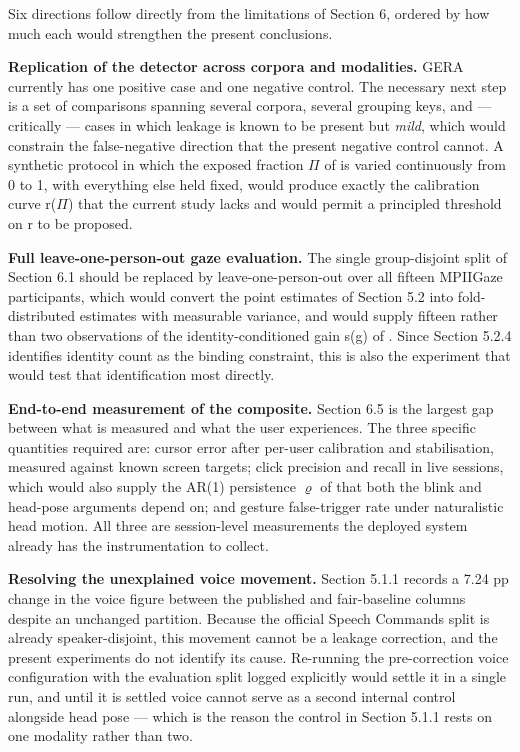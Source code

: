 Six directions follow directly from the limitations of Section 6, ordered by how much each would strengthen the present conclusions.

\textbf{Replication of the detector across corpora and modalities.} GERA currently has one positive case and one negative control. The necessary next step is a set of comparisons spanning several corpora, several grouping keys, and --- critically --- cases in which leakage is known to be present but \emph{mild}, which would constrain the false-negative direction that the present negative control cannot. A synthetic protocol in which the exposed fraction $\Pi$ of  is varied continuously from 0 to 1, with everything else held fixed, would produce exactly the calibration curve r($\Pi$) that the current study lacks and would permit a principled threshold on r to be proposed.

\textbf{Full leave-one-person-out gaze evaluation.} The single group-disjoint split of Section 6.1 should be replaced by leave-one-person-out over all fifteen MPIIGaze participants, which would convert the point estimates of Section 5.2 into fold-distributed estimates with measurable variance, and would supply fifteen rather than two observations of the identity-conditioned gain s(g) of . Since Section 5.2.4 identifies identity count as the binding constraint, this is also the experiment that would test that identification most directly.

\textbf{End-to-end measurement of the composite.} Section 6.5 is the largest gap between what is measured and what the user experiences. The three specific quantities required are: cursor error after per-user calibration and stabilisation, measured against known screen targets; click precision and recall in live sessions, which would also supply the AR(1) persistence $\varrho$ of  that both the blink and head-pose arguments depend on; and gesture false-trigger rate under naturalistic head motion. All three are session-level measurements the deployed system already has the instrumentation to collect.

\textbf{Resolving the unexplained voice movement.} Section 5.1.1 records a 7.24 pp change in the voice figure between the published and fair-baseline columns despite an unchanged partition. Because the official Speech Commands split is already speaker-disjoint, this movement cannot be a leakage correction, and the present experiments do not identify its cause. Re-running the pre-correction voice configuration with the evaluation split logged explicitly would settle it in a single run, and until it is settled voice cannot serve as a second internal control alongside head pose --- which is the reason the control in Section 5.1.1 rests on one modality rather than two.

